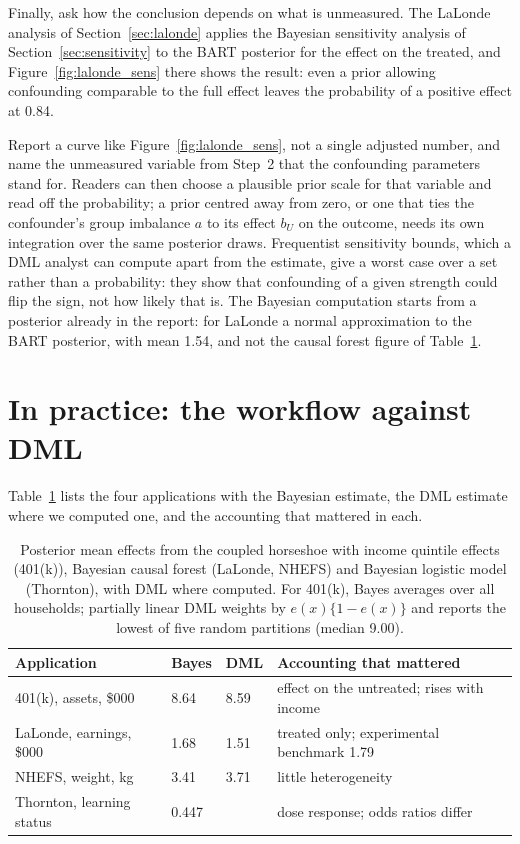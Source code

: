 Finally, ask how the conclusion depends on what is unmeasured. The LaLonde analysis of Section~\ref{sec:lalonde} applies the Bayesian sensitivity analysis of Section~\ref{sec:sensitivity} to the BART posterior for the effect on the treated, and Figure~\ref{fig:lalonde_sens} there shows the result: even a prior allowing confounding comparable to the full effect leaves the probability of a positive effect at 0.84.

Report a curve like Figure~\ref{fig:lalonde_sens}, not a single adjusted number, and name the unmeasured variable from Step~2 that the confounding parameters stand for. Readers can then choose a plausible prior scale for that variable and read off the probability; a prior centred away from zero, or one that ties the confounder's group imbalance $a$ to its effect $b_U$ on the outcome, needs its own integration over the same posterior draws. Frequentist sensitivity bounds, which a DML analyst can compute apart from the estimate, give a worst case over a set rather than a probability: they show that confounding of a given strength could flip the sign, not how likely that is. The Bayesian computation starts from a posterior already in the report: for LaLonde a normal approximation to the BART posterior, with mean 1.54, and not the causal forest figure of Table~\ref{tab:apps}.

\section{In practice: the workflow against DML}

Table~\ref{tab:apps} lists the four applications with the Bayesian estimate, the DML estimate where we computed one, and the accounting that mattered in each.

\begin{table}[ht]
\centering
\caption{Posterior mean effects from the coupled horseshoe with income quintile effects (401(k)), Bayesian causal forest (LaLonde, NHEFS) and Bayesian logistic model (Thornton), with DML where computed. For 401(k), Bayes averages over all households; partially linear DML weights by $e(x)\{1 - e(x)\}$ and reports the lowest of five random partitions (median 9.00).}
\label{tab:apps}
\small
\begin{tabular}{p{1.15in}p{0.5in}p{0.5in}p{1.55in}}
\toprule
Application & Bayes & DML & Accounting that mattered \\
\midrule
401(k), assets, \$000 & 8.64 & 8.59 & effect on the untreated; rises with income \\
LaLonde, earnings, \$000 & 1.68 & 1.51 & treated only; experimental benchmark 1.79 \\
NHEFS, weight, kg & 3.41 & 3.71 & little heterogeneity \\
Thornton, learning status & 0.447 & & dose response; odds ratios differ \\
\bottomrule
\end{tabular}
\end{table}



